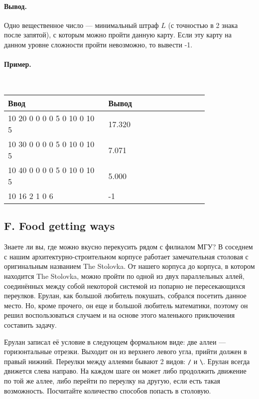 \documentclass[12pt, a4paper]{article}
\newcommand{\outformat}[1]
{
	\paragraph{Вывод.\\} #1
}
\newcommand{\exampleeee}[8]
{
	\paragraph{Пример.\\}
	{\tt
	\begin{tabular}{|p{0.4\linewidth}|p{0.4\linewidth}|}
	\hline
	Ввод 	& Вывод  	\\
	\hline
	#1 		& #2 		\\
	\hline
	#3		& #4		\\
	\hline
	#5		& #6		\\
	\hline
	#7		& #8		\\
	\hline
	\end{tabular}
	}
}
\begin{document}
\outformat{Одно вещественное число --- минимальный штраф $L$ (с точностью в 2 знака после запятой), с которым можно пройти данную карту. Если эту карту на данном уровне сложности пройти невозможно, то вывести -1.}

\exampleeee{
10 20 \newline
5 \newline
5 0 0 \newline
10 0 0 \newline
10 5 0 \newline
10 10 0 \newline
10 10 5}
{17.320}
{10 30 \newline
5 \newline
5 0 0 \newline
10 0 0 \newline
10 5 0 \newline
10 10 0 \newline
10 10 5}
{7.071}
{10 40 \newline
5 \newline
5 0 0 \newline
10 0 0 \newline
10 5 0 \newline
10 10 0 \newline
10 10 5}
{5.000}
{10 16 \newline
2 \newline
6 2 1 \newline
4 0 6}
{-1}



\subsection*{F. Food getting ways}

Знаете ли вы, где можно вкусно перекусить рядом с филиалом МГУ? В соседнем с нашим архитектурно\--строительном корпусе работает замечательная столовая с оригинальным названием The Stolovka. От нашего корпуса до корпуса, в котором находится The Stolovka, можно пройти по одной из двух параллельных аллей, соединённых между собой некоторой системой из попарно не пересекающихся переулков. Ерулан, как большой любитель покушать, собрался посетить данное место. Но, кроме прочего, он еще и большой любитель математики, поэтому он решил воспользоваться случаем и на основе этого маленького приключения составить задачу. 




Ерулан записал её условие в следующем формальном виде: две аллеи --- горизонтальные отрезки. Выходит он из верхнего левого угла, прийти должен в правый нижний. Переулки между аллеями бывают 2 видов: {\tt /} и {\tt \textbackslash}. Ерулан всегда движется слева направо. На каждом шаге он может либо продолжить движение по той же аллее, либо перейти по переулку на другую, если есть такая возможность. Посчитайте количество способов попасть в столовую.
\end{document}
